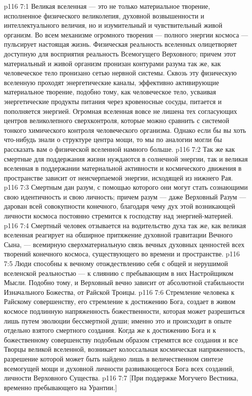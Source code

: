 \vs p116 7:1 Великая вселенная --- это не только материальное творение, исполненное физического великолепия, духовной возвышенности и интеллектуального величия, но и изумительный и чувствительный живой организм. Во всем механизме огромного творения --- полного энергии космоса --- пульсирует настоящая жизнь. Физическая реальность вселенных олицетворяет доступную для восприятия реальность Всемогущего Верховного; причем этот материальный и живой организм пронизан контурами разума так же, как человеческое тело пронизано сетью нервной системы. Сквозь эту физическую вселенную проходят энергетические каналы, эффективно активирующие материальное творение, подобно тому, как человеческое тело, усваивая энергетические продукты питания через кровеносные сосуды, питается и пополняется энергией. Огромная вселенная вовсе не лишена тех согласующих центров великолепного сверхконтроля, которые можно сравнить с системой тонкого химического контроля человеческого организма. Однако если бы вы хоть что\hyp{}нибудь знали о структуре центра мощи, то мы по аналогии могли бы рассказать вам о физической вселенной намного больше.
\vs p116 7:2 Так же как смертные для поддержания жизни нуждаются в солнечной энергии, так и великая вселенная в поддержании материальной активности и космического движения в пространстве зависит от неисчерпаемой энергии, исходящей из нижнего Рая.
\vs p116 7:3 Смертным дан разум, с помощью которого они могут стать сознающими свою идентичность и свою личность; причем разум --- даже Верховный Разум --- дарован всей совокупности конечного, благодаря чему дух этой возникающей личности космоса постоянно стремится к господству над энергией\hyp{}материей.
\vs p116 7:4 Смертный человек отзывается на водительство духа так же, как великая вселенная реагирует на обширное притяжение духовной гравитации Вечного Сына, --- всемирную сверхматериальную связь вечных духовных ценностей всех творений конечного космоса, существующего во времени и пространстве.
\vs p116 7:5 Люди способны к вечному отождествлению себя с общей и нерушимой вселенской реальностью --- к слиянию с пребывающим в них Настройщиком Мысли. Подобно тому, и Верховный вечно зависит от абсолютной стабильности Изначального Божества, от Райской Троицы.
\vs p116 7:6 Стремление человека к Райскому совершенству, его стремление к достижению Бога, создает в живом космосе подлинную напряженность божественности, которая может разрешиться лишь путем эволюции бессмертной души; именно это и происходит в опыте отдельно взятого смертного создания. Когда же к достижению Бога и к божественному совершенству подобным образом стремятся все создания и все Творцы великой вселенной, возникает колоссальная космическая напряженность, разрешение которой может быть найдено лишь в величественном синтезе всемогущей мощи и духовной личности развивающегося Бога всех созданий, личности Верховного Существа.
\vs p116 7:7 [При поддержке Могучего Вестника, временно пребывающего на Урантии.]
